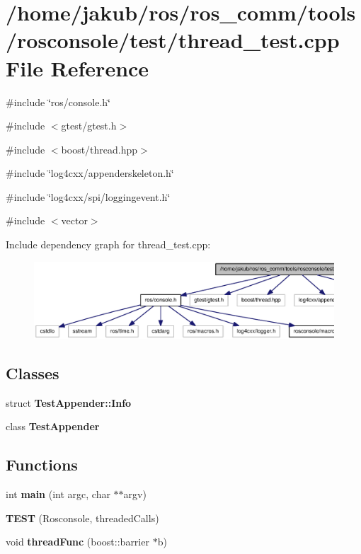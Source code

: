 \section{/home/jakub/ros/ros\_\-comm/tools/rosconsole/test/thread\_\-test.cpp File Reference}
\label{thread__test_8cpp}
{\ttfamily \#include \char`\"{}ros/console.h\char`\"{}}\par
{\ttfamily \#include $<$gtest/gtest.h$>$}\par
{\ttfamily \#include $<$boost/thread.hpp$>$}\par
{\ttfamily \#include \char`\"{}log4cxx/appenderskeleton.h\char`\"{}}\par
{\ttfamily \#include \char`\"{}log4cxx/spi/loggingevent.h\char`\"{}}\par
{\ttfamily \#include $<$vector$>$}\par
Include dependency graph for thread\_\-test.cpp:
\nopagebreak
\begin{figure}[H]
\begin{center}
\leavevmode
\includegraphics[width=400pt]{thread__test_8cpp__incl}
\end{center}
\end{figure}
\subsection*{Classes}
\begin{DoxyCompactItemize}
\item 
struct {\bf TestAppender::Info}
\item 
class {\bf TestAppender}
\end{DoxyCompactItemize}
\subsection*{Functions}
\begin{DoxyCompactItemize}
\item 
int {\bf main} (int argc, char $\ast$$\ast$argv)
\item 
{\bf TEST} (Rosconsole, threadedCalls)
\item 
void {\bf threadFunc} (boost::barrier $\ast$b)
\end{DoxyCompactItemize}


